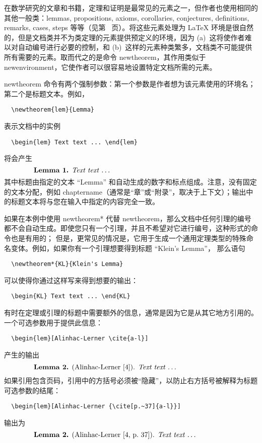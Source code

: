 \documentclass{article}
\providecommand{\qq}[1]{“#1”}
\newcommand{\ntt}{%
  \fontfamily\ttdefault \fontseries\mddefault \fontshape\updefault
  \selectfont
}
\DeclareRobustCommand{\cn}[1]{{\ntt\bslchar#1}}
\def\latex/{{\protect\LaTeX}}
\begin{document}
在数学研究的文章和书籍，定理和证明是最常见的元素之一，但作者也使用相同的其他一般类：lemmas, propositions, axioms, corollaries, conjectures, definitions, remarks, cases, steps 等等（见第~\pageref{thmstyle:list} 页）。将这些元素处理为 \latex/ 环境是很自然的，但是文档类并不为类定理的元素提供预定义的环境，因为 (a)~这将使作者难以对自动编号进行必要的控制，和 (b)~这样的元素种类繁多，文档类不可能提供所有需要的元素。取而代之的是命令 \cn{newtheorem}，其作用类似于 \cn{newenvironment}，它使作者可以很容易地设置特定文档所需的元素。

\cn{newtheorem} 命令有两个强制参数：第一个参数是作者想为该元素使用的环境名；第二个是标题文本。例如，
\begin{verbatim}
  \newtheorem{lem}{Lemma}
\end{verbatim}
表示文档中的实例
\begin{verbatim}
  \begin{lem} Text text ... \end{lem}
\end{verbatim}
将会产生
\[\makebox[.8\columnwidth]{%
  \textbf{Lemma 1.} \textit{Text text \dots}\hfill}\]
其中标题由指定的文本 \qq{Lemma} 和自动生成的数字和标点组成。注意，没有固定的文本分配，例如 \cn{chaptername}（通常是“章”或“附录”，取决于上下文）；输出中的标题文本将与您在输入中指定的内容完全一致。

如果在本例中使用 \cn{newtheorem*} 代替 \cn{newtheorem}，那么文档中任何引理的编号都不会自动生成。即使您只有一个引理，并且不希望对它进行编号，这种形式的命令也是有用的；
但是，更常见的情况是，它用于生成一个通用定理类型的特殊命名变体。例如，如果你有一个引理想要得到标题 \qq{Klein's Lemma}，
那么语句
\begin{verbatim}
  \newtheorem*{KL}{Klein's Lemma}
\end{verbatim}
可以使得你通过这样写来得到想要的输出：
\begin{verbatim}
  \begin{KL} Text text ... \end{KL}
\end{verbatim}


有时在定理或引理的标题中需要额外的信息，通常是因为它是从其它地方引用的。一个可选参数用于提供此信息：
\begin{verbatim}
  \begin{lem}[Alinhac-Lerner \cite{a-l}]
\end{verbatim}
产生的输出
\[\makebox[.8\columnwidth]{%
  \textbf{Lemma 2.} (Alinhac-Lerner [4]). \textit{Text text \dots}\hfill}\]
如果引用包含页码，引用中的方括号必须被“隐藏”，以防止右方括号被解释为标题可选参数的结尾：
\begin{verbatim}
  \begin{lem}[Alinhac-Lerner {\cite[p.~37]{a-l}}]
\end{verbatim}
输出为
\[\makebox[.8\columnwidth]{%
  \textbf{Lemma 2.} (Alinhac-Lerner [4, p.~37]). \textit{Text text \dots}\hfill}\]
\end{document}
